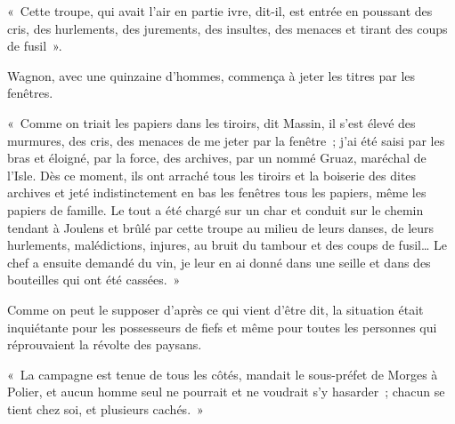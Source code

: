 \documentclass[french,twoside]{book} %
\newenvironment{quoteblock}%
  {\begin{quoting}}
  {\end{quoting}}
\newenvironment{quotebar}{%
    \def\FrameCommand{{\color{rubric!10!}\vrule width 0.5em} \hspace{0.9em}}%
    \def\OuterFrameSep{\itemsep} %
    \MakeFramed {\advance\hsize-\width \FrameRestore}
  }%
  {%
    \endMakeFramed
  }
\renewenvironment{quoteblock}%
  {%
    \savenotes
    \setstretch{0.9}
    \normalfont
    \begin{quotebar}
  }
  {%
    \end{quotebar}
    \spewnotes
  }
\begin{document}
\begin{quoteblock}
 \noindent « Cette troupe, qui avait l’air en partie ivre, dit-il, est entrée en poussant des cris, des hurlements, des jurements, des insultes, des menaces et tirant des coups de fusil ».
 \end{quoteblock}

\noindent Wagnon, avec une quinzaine d’hommes, commença à jeter les titres par les fenêtres.\par

\begin{quoteblock}
 \noindent « Comme on triait les papiers dans les tiroirs, dit Massin, il s’est élevé des murmures, des cris, des menaces de me jeter par la fenêtre ; j’ai été saisi par les bras et éloigné, par la force, des archives, par un nommé Gruaz, maréchal de l’Isle. Dès ce moment, ils ont arraché tous les tiroirs et la boiserie des dites archives et jeté indistinctement en bas les fenêtres tous les papiers, même les papiers de famille. Le tout a été chargé sur un char et conduit sur le chemin tendant à Joulens et brûlé par cette troupe au milieu de leurs danses, de leurs hurlements, malédictions, injures, au bruit du tambour et des coups de fusil… Le chef a ensuite demandé du vin, je leur en ai donné dans une seille et dans des bouteilles qui ont été cassées. »
 \end{quoteblock}

\noindent Comme on peut le supposer d’après ce qui vient d’être dit, la situation était inquiétante pour les possesseurs de fiefs et même pour toutes les personnes qui réprouvaient la révolte des paysans.\par

\begin{quoteblock}
 \noindent « La campagne est tenue de tous les côtés, mandait le sous-préfet de Morges à Polier, et aucun homme seul ne pourrait et ne voudrait s’y hasarder ; chacun se tient chez soi, et plusieurs cachés. »
 \end{quoteblock}
\end{document}
